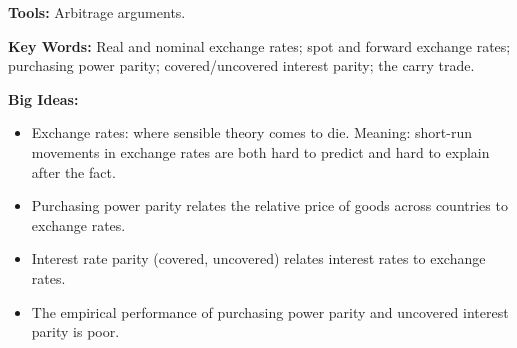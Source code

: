\textbf{Tools:} Arbitrage arguments.

\textbf{Key Words:} Real and nominal exchange rates; spot and forward exchange rates;
 purchasing power parity; covered/uncovered interest parity; the carry trade.

\textbf{Big Ideas:}
\begin{itemize}
\item Exchange rates:  where sensible theory comes to die.
Meaning:  short-run movements in exchange rates are both hard to predict and hard to explain after the fact.
\item Purchasing power parity relates the relative price of goods across countries to exchange rates.
\item Interest rate parity (covered, uncovered) relates interest rates to exchange rates.
\item The empirical performance of purchasing power parity and uncovered interest parity is poor.
\end{itemize}
